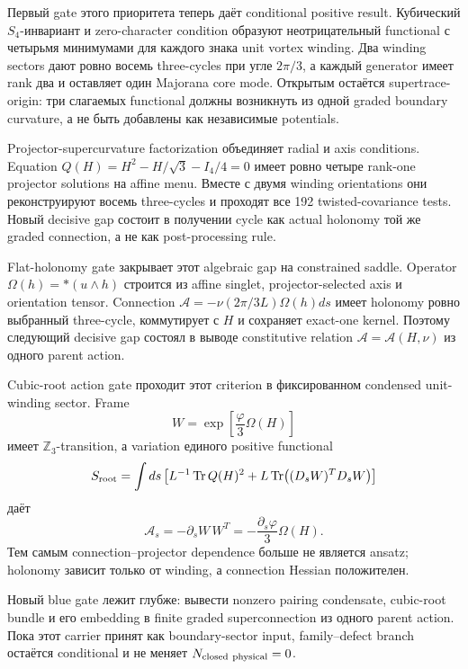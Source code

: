 Первый gate этого приоритета теперь даёт conditional positive result.
Кубический \(S_4\)-инвариант и zero-character condition образуют
неотрицательный functional с четырьмя минимумами для каждого знака unit
vortex winding. Два winding sectors дают ровно восемь three-cycles при
угле \(2\pi/3\), а каждый generator имеет rank два и оставляет один
Majorana core mode. Открытым остаётся supertrace-origin: три слагаемых
functional должны возникнуть из одной graded boundary curvature, а не быть
добавлены как независимые potentials.

Projector-supercurvature factorization объединяет radial и axis conditions.
Equation \(Q(H)=H^2-H/\sqrt3-I_4/4=0\) имеет ровно четыре rank-one
projector solutions на affine menu. Вместе с двумя winding orientations
они реконструируют восемь three-cycles и проходят все 192
twisted-covariance tests. Новый decisive gap состоит в получении cycle как
actual holonomy той же graded connection, а не как post-processing rule.

Flat-holonomy gate закрывает этот algebraic gap на constrained saddle.
Operator \(\Omega(h)=*(u\wedge h)\) строится из affine singlet,
projector-selected axis и orientation tensor. Connection
\(\mathcal A=-\nu(2\pi/3L)\Omega(h)ds\) имеет holonomy ровно выбранный
three-cycle, коммутирует с \(H\) и сохраняет exact-one kernel. Поэтому
следующий decisive gap состоял в выводе constitutive relation
\(\mathcal A=\mathcal A(H,\nu)\) из одного parent action.

Cubic-root action gate проходит этот criterion в фиксированном condensed
unit-winding sector. Frame
\begin{equation}
 W=\exp\!\left[\frac{\varphi}{3}\Omega(H)\right]
\end{equation}
имеет \(\mathbb Z_3\)-transition, а variation единого positive functional
\begin{equation}
 S_{\rm root}=\int ds\left[
 L^{-1}\operatorname{Tr} Q(H)^2+L\operatorname{Tr}\!\left((D_sW)^TD_sW\right)
 \right]
\end{equation}
даёт
\begin{equation}
 \mathcal A_s=-\partial_sW\,W^T
 =-\frac{\partial_s\varphi}{3}\Omega(H).
\end{equation}
Тем самым connection--projector dependence больше не является ansatz;
holonomy зависит только от winding, а connection Hessian положителен.

Новый blue gate лежит глубже: вывести nonzero pairing condensate,
cubic-root bundle и его embedding в finite graded superconnection из одного
parent action. Пока этот carrier принят как boundary-sector input,
family--defect branch остаётся conditional и не меняет
\(N_{\rm closed\ physical}=0\).

